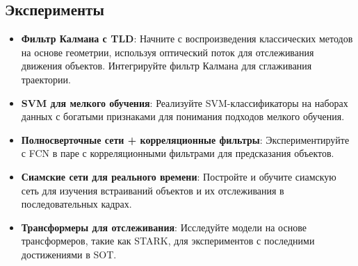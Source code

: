 \subsection{Эксперименты}
\begin{itemize}
    \item \textbf{Фильтр Калмана с TLD}: Начните с воспроизведения классических методов на основе геометрии, используя оптический поток для отслеживания движения объектов. Интегрируйте фильтр Калмана для сглаживания траектории.
    \item \textbf{SVM для мелкого обучения}: Реализуйте SVM-классификаторы на наборах данных с богатыми признаками для понимания подходов мелкого обучения.
    \item \textbf{Полносверточные сети + корреляционные фильтры}: Экспериментируйте с FCN в паре с корреляционными фильтрами для предсказания объектов.
    \item \textbf{Сиамские сети для реального времени}: Постройте и обучите сиамскую сеть для изучения встраиваний объектов и их отслеживания в последовательных кадрах.
    \item \textbf{Трансформеры для отслеживания}: Исследуйте модели на основе трансформеров, такие как STARK, для экспериментов с последними достижениями в SOT.
\end{itemize}